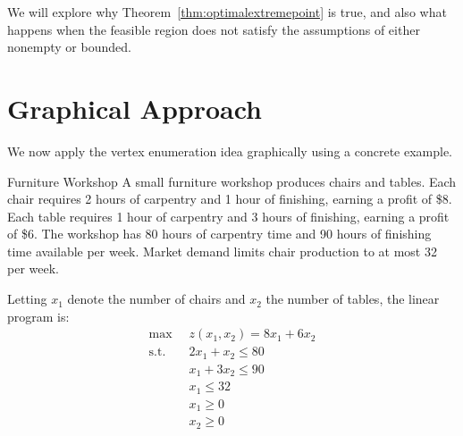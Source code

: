 We will explore why Theorem~\ref{thm:optimalextremepoint} is true, and also what happens when the feasible region does not satisfy the assumptions of either nonempty or bounded.

\section{Graphical Approach}\label{sec:graphical-approach}
We now apply the vertex enumeration idea graphically using a concrete example.

\begin{example}{Furniture Workshop}\label{ex:FurnitureWorkshop}
A small furniture workshop produces chairs and tables. Each chair requires 2 hours of carpentry and 1 hour of finishing, earning a profit of \$8. Each table requires 1 hour of carpentry and 3 hours of finishing, earning a profit of \$6. The workshop has 80 hours of carpentry time and 90 hours of finishing time available per week. Market demand limits chair production to at most 32 per week.

Letting $x_1$ denote the number of chairs and $x_2$ the number of tables, the linear program is:
\begin{equation}
\begin{aligned}
\max\;\;& z(x_1,x_2) = 8x_1 + 6x_2\\
\text{s.t.}\;\;&  2x_1 + x_2 \leq 80\\
& x_1 + 3x_2 \leq 90\\
& x_1 \leq 32\\
& x_1 \geq 0\\
& x_2 \geq 0
\end{aligned}
\label{eqn:FurnitureWorkshop}
\end{equation}
\end{example}

